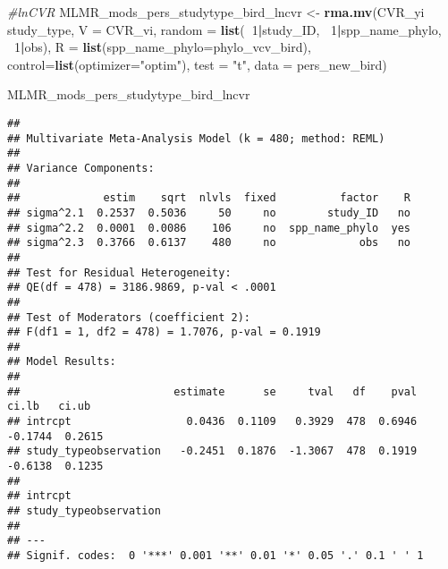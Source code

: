 \documentclass[]{article}
\newenvironment{Shaded}{\begin{snugshade}}{\end{snugshade}}
\newcommand{\KeywordTok}[1]{\textcolor[rgb]{0.13,0.29,0.53}{\textbf{#1}}}
\newcommand{\DataTypeTok}[1]{\textcolor[rgb]{0.13,0.29,0.53}{#1}}
\newcommand{\DecValTok}[1]{\textcolor[rgb]{0.00,0.00,0.81}{#1}}
\newcommand{\StringTok}[1]{\textcolor[rgb]{0.31,0.60,0.02}{#1}}
\newcommand{\CommentTok}[1]{\textcolor[rgb]{0.56,0.35,0.01}{\textit{#1}}}
\newcommand{\OperatorTok}[1]{\textcolor[rgb]{0.81,0.36,0.00}{\textbf{#1}}}
\newcommand{\NormalTok}[1]{#1}
\begin{document}
\begin{Shaded}
\begin{Highlighting}[]
      \CommentTok{#lnCVR}
\NormalTok{      MLMR_mods_pers_studytype_bird_lncvr <-}\StringTok{ }\KeywordTok{rma.mv}\NormalTok{(CVR_yi }\OperatorTok{~}\StringTok{ }\NormalTok{study_type, }\DataTypeTok{V =}\NormalTok{ CVR_vi, }
                                                   \DataTypeTok{random =} \KeywordTok{list}\NormalTok{(}\OperatorTok{~}\DecValTok{1}\OperatorTok{|}\NormalTok{study_ID, }\OperatorTok{~}\DecValTok{1}\OperatorTok{|}\NormalTok{spp_name_phylo, }\OperatorTok{~}\DecValTok{1}\OperatorTok{|}\NormalTok{obs), }
                                                   \DataTypeTok{R =} \KeywordTok{list}\NormalTok{(}\DataTypeTok{spp_name_phylo=}\NormalTok{phylo_vcv_bird), }\DataTypeTok{control=}\KeywordTok{list}\NormalTok{(}\DataTypeTok{optimizer=}\StringTok{"optim"}\NormalTok{), }
                                                   \DataTypeTok{test =} \StringTok{"t"}\NormalTok{, }\DataTypeTok{data =}\NormalTok{ pers_new_bird)}

\NormalTok{      MLMR_mods_pers_studytype_bird_lncvr}
\end{Highlighting}
\end{Shaded}

\begin{verbatim}
## 
## Multivariate Meta-Analysis Model (k = 480; method: REML)
## 
## Variance Components:
## 
##             estim    sqrt  nlvls  fixed          factor    R 
## sigma^2.1  0.2537  0.5036     50     no        study_ID   no 
## sigma^2.2  0.0001  0.0086    106     no  spp_name_phylo  yes 
## sigma^2.3  0.3766  0.6137    480     no             obs   no 
## 
## Test for Residual Heterogeneity:
## QE(df = 478) = 3186.9869, p-val < .0001
## 
## Test of Moderators (coefficient 2):
## F(df1 = 1, df2 = 478) = 1.7076, p-val = 0.1919
## 
## Model Results:
## 
##                        estimate      se     tval   df    pval    ci.lb   ci.ub 
## intrcpt                  0.0436  0.1109   0.3929  478  0.6946  -0.1744  0.2615 
## study_typeobservation   -0.2451  0.1876  -1.3067  478  0.1919  -0.6138  0.1235 
##  
## intrcpt 
## study_typeobservation 
## 
## ---
## Signif. codes:  0 '***' 0.001 '**' 0.01 '*' 0.05 '.' 0.1 ' ' 1
\end{verbatim}
\end{document}
